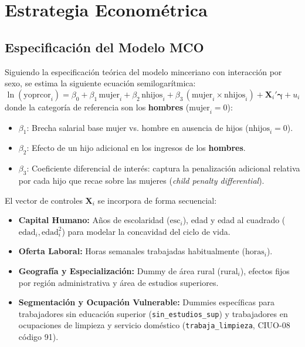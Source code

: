 \documentclass[11pt,a4paper]{article}
\begin{document}
\section{Estrategia Econométrica}
\subsection{Especificación del Modelo MCO}
Siguiendo la especificación teórica del modelo minceriano con interacción por sexo, se estima la siguiente ecuación semilogarítmica:
\begin{equation}
    \ln(\text{yoprcor}_i) = \beta_0 + \beta_1\,\text{mujer}_i + \beta_2\,\text{nhijos}_i + \beta_3\,(\text{mujer}_i \times \text{nhijos}_i) + \mathbf{X}_i'\boldsymbol{\gamma} + u_i
    \label{eq:mco_base_hombre}
\end{equation}
donde la categoría de referencia son los \textbf{hombres} ($\text{mujer}_i = 0$):
\begin{itemize}
    \item $\beta_1$: Brecha salarial base mujer vs. hombre en ausencia de hijos ($\text{nhijos}_i = 0$).
    \item $\beta_2$: Efecto de un hijo adicional en los ingresos de los \textbf{hombres}.
    \item $\beta_3$: Coeficiente diferencial de interés: captura la penalización adicional relativa por cada hijo que recae sobre las mujeres (\textit{child penalty differential}).
\end{itemize}

El vector de controles $\mathbf{X}_i$ se incorpora de forma secuencial:
\begin{itemize}
    \item \textbf{Capital Humano:} Años de escolaridad ($\text{esc}_i$), edad y edad al cuadrado ($\text{edad}_i, \text{edad}_i^2$) para modelar la concavidad del ciclo de vida.
    \item \textbf{Oferta Laboral:} Horas semanales trabajadas habitualmente ($\text{horas}_i$).
    \item \textbf{Geografía y Especialización:} Dummy de área rural ($\text{rural}_i$), efectos fijos por región administrativa y área de estudios superiores.
    \item \textbf{Segmentación y Ocupación Vulnerable:} Dummies específicas para trabajadores sin educación superior (\texttt{sin\_estudios\_sup}) y trabajadores en ocupaciones de limpieza y servicio doméstico (\texttt{trabaja\_limpieza}, CIUO-08 código 91).
\end{itemize}
\end{document}
